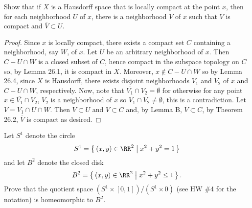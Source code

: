 \newpage
\begin{problem}[Munkres \S29, Ex.\,10]
Show that if $X$ is a Hausdorff space that is locally compact at
the point $x$, then for each neighborhood $U$ of $x$, there is a
neighborhood $V$ of $x$ such that $\overline V$ is compact and
$\overline V\subset U$.
\end{problem}
\begin{proof}
Since $x$ is locally compact, there exists a compact set $C$
containing a neighborhood, say $W$, of $x$. Let $U$ be an
arbitrary neighborhood of $x$. Then $C-U\cap W$ is a closed
subset of $C$, hence compact in the subspace topology on $C$ so,
by Lemma 26.1, it is compact in $X$. Moreover, $x\notin C-U\cap
W$ so by Lemma 26.4, since $X$ is Hausdorff, there exists
disjoint neighborhoods $V_1$ and $V_2$ of $x$ and $C-U\cap W$,
respectively. Now, note that $\overline{V_1}\cap V_2=\emptyset$ for
otherwise for any point $x\in\overline{V_1}\cap V_2$, $V_2$ is a
neighborhood of $x$ so $V_1\cap V_2\neq\emptyset$, this is a
contradiction. Let $V=V_1\cap U\cap W$. Then $V\subset U$ and
$V\subset C$ and, by Lemma B, $\overline V\subset C$, by Theorem
26.2, $\overline V$ is compact as desired.
\end{proof}
\newpage
\begin{problem}[A]
Let $S^1$ denote the circle
\[
S^1=\left\{\,(x,y)\in\RR^2\;\middle|\;x^2+y^2=1\,\right\}
\]
and let $B^2$ denote the closed disk
\[
B^2=\left\{\,(x,y)\in\RR^2\;\middle|\;x^2+y^2\leq 1\,\right\}.
\]
Prove that the quotient space $(S^1\times[0,1])/(S^1\times 0)$
(see HW \#4 for the notation) is homeomorphic to $B^2$.
\end{problem}
